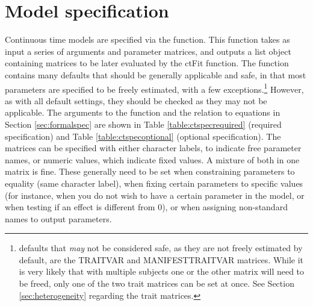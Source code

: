 \documentclass[nojss]{jss}\usepackage[]{graphicx}\usepackage[]{color}
\begin{document}
\section{Model specification} \label{sec:modelspec}\nopagebreak
Continuous time models are specified via the  function. This function takes as input a series of arguments and parameter matrices, and outputs a list object containing matrices to be later evaluated by the ctFit function. The  function contains many defaults that should be generally applicable and safe, in that most parameters are specified to be freely estimated, with a few exceptions.\footnote{ defaults that \textit{may} not be considered safe, as they are not freely estimated by default, are the TRAITVAR and MANIFESTTRAITVAR matrices. While it is very likely that with multiple subjects one or the other matrix will need to be freed, only one of the two trait matrices can be set at once. See Section \ref{sec:heterogeneity} regarding the trait matrices.} However, as with all default settings, they should be checked as they may not be applicable. 
The arguments to the  function and the relation to equations in Section \ref{sec:formalspec} are shown in Table \ref{table:ctspecrequired} (required specification) and Table \ref{table:ctspecoptional} (optional specification). The matrices can be specified with either character labels, to indicate free parameter names, or numeric values, which indicate fixed values. A mixture of both in one matrix is fine. These generally need to be set when constraining parameters to equality (same character label), when fixing certain parameters to specific values (for instance, when you do not wish to have a certain parameter in the model, or when testing if an effect is different from 0), or when assigning non-standard names to output parameters. 
\end{document}

